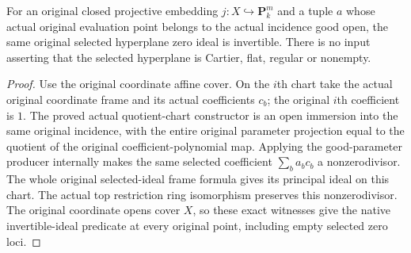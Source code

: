 \begin{theorem}
\label{thm:kn-nadel-bertini-snc-flat-selected-cartier}
\leanok
{}
For an original closed projective embedding $j:X\hookrightarrow\mathbf P^m_k$
and a tuple $a$ whose actual original evaluation point belongs to the
actual incidence good open, the same original selected hyperplane zero
ideal is invertible. There is no input asserting that the selected
hyperplane is Cartier, flat, regular or nonempty.
\end{theorem}
\begin{proof}
Use the original coordinate affine cover. On the $i$th chart take the
actual original coordinate frame and its actual coefficients $c_b$;
the original $i$th coefficient is $1$. The proved actual quotient-chart
constructor is an open immersion into the same original incidence, with
the entire original parameter projection equal to the quotient of the
original coefficient-polynomial map. Applying the good-parameter
producer internally makes the same selected coefficient $\sum_b a_bc_b$
a nonzerodivisor. The whole original selected-ideal frame formula gives
its principal ideal on this chart. The actual top restriction ring
isomorphism preserves this nonzerodivisor. The original coordinate opens
cover $X$, so these exact witnesses give the native invertible-ideal
predicate at every original point, including empty selected zero loci.
\end{proof}

